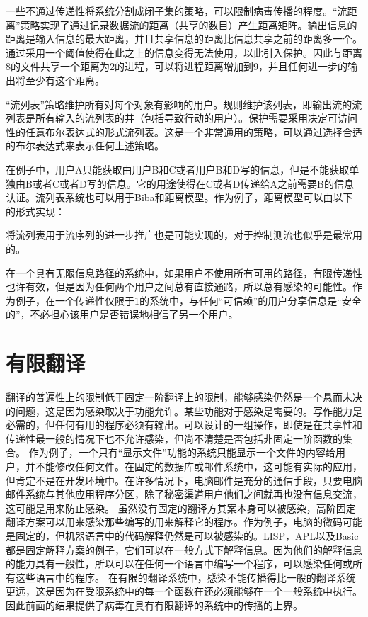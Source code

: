一些不通过传递性将系统分割成闭子集的策略，可以限制病毒传播的程度。“流距离”策略实现了通过记录数据流的距离（共享的数目）产生距离矩阵。输出信息的距离是输入信息的最大距离，并且共享信息的距离比信息共享之前的距离多一个。通过采用一个阈值使得在此之上的信息变得无法使用，以此引入保护。因此与距离8的文件共享一个距离为2的进程，可以将进程距离增加到9，并且任何进一步的输出将至少有这个距离。


“流列表”策略维护所有对每个对象有影响的用户。规则维护该列表，即输出流的流列表是所有输入的流列表的并（包括导致行动的用户）。保护需要采用决定可访问性的任意布尔表达式的形式流列表。这是一个非常通用的策略，可以通过选择合适的布尔表达式来表示任何上述策略。


在例子中，用户A只能获取由用户B和C或者用户B和D写的信息，但是不能获取单独由B或者C或者D写的信息。它的用途使得在C或者D传递给A之前需要B的信息认证。流列表系统也可以用于Biba和距离模型。作为例子，距离模型可以由以下的形式实现：


将流列表用于流序列的进一步推广也是可能实现的，对于控制测流也似乎是最常用的。

在一个具有无限信息路径的系统中，如果用户不使用所有可用的路径，有限传递性也许有效，但是因为任何两个用户之间总有直接通路，所以总有感染的可能性。作为例子，在一个传递性仅限于1的系统中，与任何“可信赖”的用户分享信息是“安全的”，不必担心该用户是否错误地相信了另一个用户。


\section{有限翻译}

翻译的普遍性上的限制低于固定一阶翻译上的限制，能够感染仍然是一个悬而未决的问题，这是因为感染取决于功能允许。某些功能对于感染是需要的。写作能力是必需的，但任何有用的程序必须有输出。可以设计的一组操作，即使是在共享性和传递性最一般的情况下也不允许感染，但尚不清楚是否包括非固定一阶函数的集合。
作为例子，一个只有“显示文件”功能的系统只能显示一个文件的内容给用户，并不能修改任何文件。在固定的数据库或邮件系统中，这可能有实际的应用，但肯定不是在开发环境中。在许多情况下，电脑邮件是充分的通信手段，只要电脑邮件系统与其他应用程序分区，除了秘密渠道用户他们之间就再也没有信息交流，这可能是用来防止感染。
虽然没有固定的翻译方其案本身可以被感染，高阶固定翻译方案可以用来感染那些编写的用来解释它的程序。作为例子，电脑的微码可能是固定的，但机器语言中的代码解释仍然是可以被感染的。LISP，APL以及Basic都是固定解释方案的例子，它们可以在一般方式下解释信息。因为他们的解释信息的能力具有一般性，所以可以在任何一个语言中编写一个程序，可以感染任何或所有这些语言中的程序。
在有限的翻译系统中，感染不能传播得比一般的翻译系统更远，这是因为在受限系统中的每一个函数在还必须能够在一个一般系统中执行。因此前面的结果提供了病毒在具有有限翻译的系统中的传播的上界。

